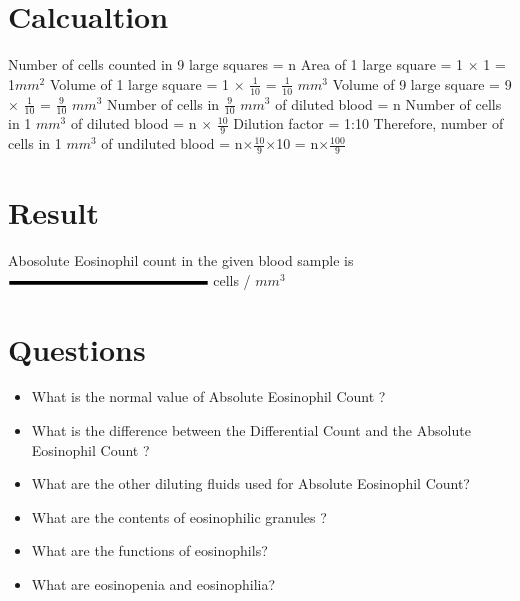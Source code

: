 \documentclass[a4paper,12pt]{book}
\begin{document}
	\section*{Calcualtion}
	Number of cells counted in 9 large squares				=	n\newline\vspace{.2cm}
	Area of 1 large square				=	1 $\times$ 1		=	1$mm^2$	\newline\vspace{.2cm}
	Volume of 1 large square				=	1 $\times$ $\frac{1}{10}$	=	$\frac{1}{10}$ $mm^3$\newline\vspace{.2cm}
	Volume of 9 large square				=	9 $\times$ $\frac{1}{10}$	=	$\frac{9}{10}$ $mm^3$\newline\vspace{.2cm}
	Number of cells in $\frac{9}{10}$ $mm^3$ of diluted blood				=	n\newline\vspace{.2cm}
	Number of cells in 1 $mm^3$ of diluted blood				=	n $\times$ $\frac{10}{9}$\newline\vspace{.2cm}
	Dilution factor								=	1:10\newline\vspace{.2cm}
Therefore, number of cells in 1 $mm^3$ of undiluted blood		=	n$\times$$\frac{10}{9}$$\times$10
										=	n$\times$$\frac{100}{9}$
	\section*{Result}

Abosolute Eosinophil count in the given  blood sample is $\rule{5cm}{0.1cm}$ cells / $mm^3$

	\section*{Questions}
	\begin{itemize}

		\item{What is the normal value of Absolute Eosinophil Count ?}
		\item{What is the difference between the Differential Count and the Absolute Eosinophil Count ?}
		\item{What are the other diluting fluids used for Absolute Eosinophil Count?}
		\item{What are the contents of eosinophilic granules ?}
		\item{What are the functions of eosinophils?}
		\item{What are eosinopenia and eosinophilia?}
	\end{itemize}
\end{document}

